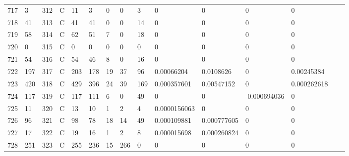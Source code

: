 \begin{longtable}{lllllllllllllll}
	717 & 3                 & 312 & C   & 11                & 3                 & 0                 & 0    & 3          & 0              & 0              & 0             & 0            \\
	718 & 41                & 313 & C   & 41                & 41                & 0                 & 0    & 14         & 0              & 0              & 0             & 0            \\
	719 & 58                & 314 & C   & 62                & 51                & 7                 & 0    & 18         & 0              & 0              & 0             & 0            \\
	720 & 0                 & 315 & C   & 0                 & 0                 & 0                 & 0    & 0          & 0              & 0              & 0             & 0            \\
	721 & 54                & 316 & C   & 54                & 46                & 8                 & 0    & 16         & 0              & 0              & 0             & 0            \\
	722 & 197               & 317 & C   & 203               & 178               & 19                & 37   & 96         & 0.00066204     & 0.0108626      & 0             & 0.00245384   \\
	723 & 420               & 318 & C   & 429               & 396               & 24                & 39   & 169        & 0.000357601    & 0.00547152     & 0             & 0.000262618  \\
	724 & 117               & 319 & C   & 117               & 111               & 6                 & 0    & 49         & 0              & 0              & -0.000694036  & 0            \\
	725 & 11                & 320 & C   & 13                & 10                & 1                 & 2    & 4          & 0.0000156063   & 0              & 0             & 0            \\
	726 & 96                & 321 & C   & 98                & 78                & 18                & 14   & 49         & 0.000109881    & 0.000777605    & 0             & 0            \\
	727 & 17                & 322 & C   & 19                & 16                & 1                 & 2    & 8          & 0.000015698    & 0.000260824    & 0             & 0            \\
	728 & 251               & 323 & C   & 255               & 236               & 15                & 266  & 0          & 0              & 0              & 0             & 0            \\

\end{longtable}
